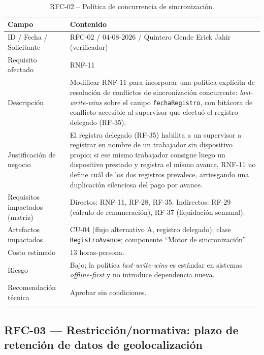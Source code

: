 \documentclass[11pt,a4paper]{article}
\begin{document}
\begin{longtable}{p{3cm}p{10.8cm}}
\toprule
\textbf{Campo} & \textbf{Contenido} \\
\midrule
\endhead
ID / Fecha / Solicitante & RFC-02 / 04-08-2026 / Quintero Gende Erick Jahir (verificador) \\
Requisito afectado & RNF-11 \\
Descripción & Modificar RNF-11 para incorporar una política explícita de resolución de conflictos de sincronización concurrente: \emph{last-write-wins} sobre el campo \texttt{fechaRegistro}, con bitácora de conflicto accesible al supervisor que efectuó el registro delegado (RF-35). \\
Justificación de negocio & El registro delegado (RF-35) habilita a un supervisor a registrar en nombre de un trabajador sin dispositivo propio; si ese mismo trabajador consigue luego un dispositivo prestado y registra el mismo avance, RNF-11 no define cuál de los dos registros prevalece, arriesgando una duplicación silenciosa del pago por avance. \\
Requisitos impactados (matriz) & Directos: RNF-11, RF-28, RF-35. Indirectos: RF-29 (cálculo de remuneración), RF-37 (liquidación semanal). \\
Artefactos impactados & CU-04 (flujo alternativo A, registro delegado); clase \texttt{RegistroAvance}; componente ``Motor de sincronización''. \\
Costo estimado & 13 horas-persona. \\
Riesgo & Bajo; la política \emph{last-write-wins} es estándar en sistemas \emph{offline-first} y no introduce dependencia nueva. \\
Recomendación técnica & Aprobar sin condiciones. \\
\bottomrule
\caption{RFC-02 -- Política de concurrencia de sincronización.}
\end{longtable}

\subsection{RFC-03 --- Restricción/normativa: plazo de retención de datos de geolocalización}
\end{document}
